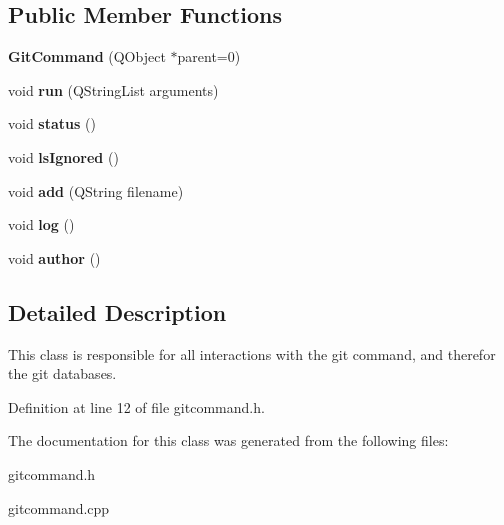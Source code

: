 \subsection*{Public Member Functions}
\begin{DoxyCompactItemize}
\item 
\hypertarget{class_git_command_ada4bd255e76af1ab8f15ecfef65ff435}{
{\bfseries GitCommand} (QObject $\ast$parent=0)}
\label{class_git_command_ada4bd255e76af1ab8f15ecfef65ff435}

\item 
\hypertarget{class_git_command_af2162840462484daa73bee02f66e8d54}{
void {\bfseries run} (QStringList arguments)}
\label{class_git_command_af2162840462484daa73bee02f66e8d54}

\item 
\hypertarget{class_git_command_a038aa269b251635935f60b0e683d3209}{
void {\bfseries status} ()}
\label{class_git_command_a038aa269b251635935f60b0e683d3209}

\item 
\hypertarget{class_git_command_a11e4a48f1f98e31f4047d454106cb354}{
void {\bfseries lsIgnored} ()}
\label{class_git_command_a11e4a48f1f98e31f4047d454106cb354}

\item 
\hypertarget{class_git_command_a0b915b41bd54238d44ca314030ebe023}{
void {\bfseries add} (QString filename)}
\label{class_git_command_a0b915b41bd54238d44ca314030ebe023}

\item 
\hypertarget{class_git_command_a48837cbba385fe546f0f586a79705766}{
void {\bfseries log} ()}
\label{class_git_command_a48837cbba385fe546f0f586a79705766}

\item 
\hypertarget{class_git_command_af27ca9c48f85b3ce43d6ce18cfb72871}{
void {\bfseries author} ()}
\label{class_git_command_af27ca9c48f85b3ce43d6ce18cfb72871}

\end{DoxyCompactItemize}


\subsection{Detailed Description}
This class is responsible for all interactions with the git command, and therefor the git databases. 

Definition at line 12 of file gitcommand.h.



The documentation for this class was generated from the following files:\begin{DoxyCompactItemize}
\item 
gitcommand.h\item 
gitcommand.cpp\end{DoxyCompactItemize}
